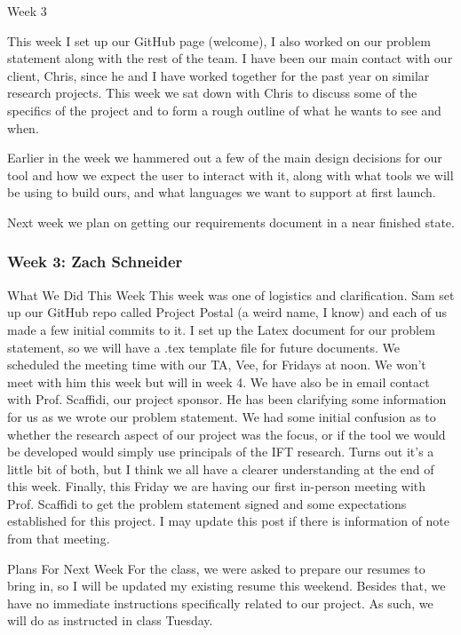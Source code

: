 Week 3

This week I set up our GitHub page (welcome), I also worked on our problem statement along with the rest of the team. I have been our main contact with our client, Chris, since he and I have worked together for the past year on similar research projects. This week we sat down with Chris to discuss some of the specifics of the project and to form a rough outline of what he wants to see and when.

Earlier in the week we hammered out a few of the main design decisions for our tool and how we expect the user to interact with it, along with what tools we will be using to build ours, and what languages we want to support at first launch.

Next week we plan on getting our requirements document in a near finished state.

\subsubsection{Week 3: Zach Schneider}

What We Did This Week
This week was one of logistics and clarification. Sam set up our GitHub repo called Project Postal (a weird name, I know) and each of us made a few initial commits to it. I set up the Latex document for our problem statement, so we will have a .tex template file for future documents. We scheduled the meeting time with our TA, Vee, for Fridays at noon. We won't meet with him this week but will in week 4. We have also be in email contact with Prof. Scaffidi, our project sponsor. He has been clarifying some information for us as we wrote our problem statement. We had some initial confusion as to whether the research aspect of our project was the focus, or if the tool we would be developed would simply use principals of the IFT research. Turns out it's a little bit of both, but I think we all have a clearer understanding at the end of this week. Finally, this Friday we are having our first in-person meeting with Prof. Scaffidi to get the problem statement signed and some expectations established for this project. I may update this post if there is information of note from that meeting.

Plans For Next Week
For the class, we were asked to prepare our resumes to bring in, so I will be updated my existing resume this weekend. Besides that, we have no immediate instructions specifically related to our project. As such, we will do as instructed in class Tuesday.

